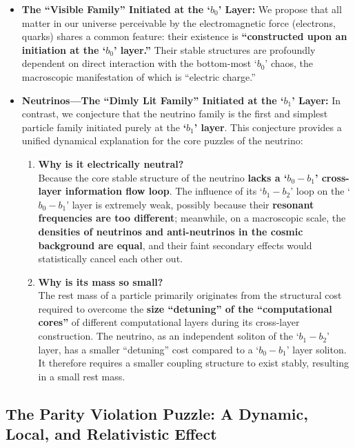 \documentclass[11pt, a4paper]{article}
\begin{document}
\begin{itemize}
    \item \textbf{The ``Visible Family'' Initiated at the `$b_0$' Layer:} We propose that all matter in our universe perceivable by the electromagnetic force (electrons, quarks) shares a common feature: their existence is \textbf{``constructed upon an initiation at the `$b_0$' layer.''} Their stable structures are profoundly dependent on direct interaction with the bottom-most `$b_0$' chaos, the macroscopic manifestation of which is ``electric charge.''

    \item \textbf{Neutrinos—The ``Dimly Lit Family'' Initiated at the `$b_1$' Layer:} In contrast, we conjecture that the neutrino family is the first and simplest particle family initiated purely at the \textbf{`$b_1$' layer}. This conjecture provides a unified dynamical explanation for the core puzzles of the neutrino:
    \begin{enumerate}
        \item \textbf{Why is it electrically neutral?} \\
        Because the core stable structure of the neutrino \textbf{lacks a `$b_0-b_1$' cross-layer information flow loop}. The influence of its `$b_1-b_2$' loop on the `$b_0-b_1$' layer is extremely weak, possibly because their \textbf{resonant frequencies are too different}; meanwhile, on a macroscopic scale, the \textbf{densities of neutrinos and anti-neutrinos in the cosmic background are equal}, and their faint secondary effects would statistically cancel each other out.

        \item \textbf{Why is its mass so small?} \\
		The rest mass of a particle primarily originates from the structural cost required to overcome the \textbf{size ``detuning'' of the ``computational cores''} of different computational layers during its cross-layer construction. The neutrino, as an independent soliton of the `$b_1-b_2$' layer, has a smaller ``detuning'' cost compared to a `$b_0-b_1$' layer soliton. It therefore requires a smaller coupling structure to exist stably, resulting in a small rest mass.
    \end{enumerate}
\end{itemize}

\subsection{The Parity Violation Puzzle: A Dynamic, Local, and Relativistic Effect}
\end{document}
